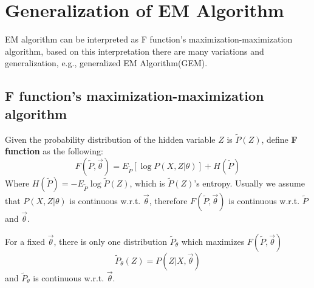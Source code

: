 \section{Generalization of EM Algorithm}
EM algorithm can be interpreted as F function's maximization-maximization algorithm, based on this interpretation there are many variations and generalization, e.g., generalized EM Algorithm(GEM).


\subsection{F function's maximization-maximization algorithm}
\begin{definition}
Given the probability distribution of the hidden variable $Z$ is $\tilde{P}(Z)$, define \textbf{F function} as the following:
\begin{equation}
F(\tilde{P},\vec{\theta})=E_{\tilde{P}}\left[\log{P(X,Z|\theta)}\right]+H(\tilde{P})
\end{equation}
Where $H(\tilde{P})=-E_{\tilde{P}}\log\tilde{P}(Z)$, which is $\tilde{P}(Z)$'s entropy. Usually we assume that $P(X,Z|\theta)$ is continuous w.r.t. $\vec{\theta}$, therefore $F(\tilde{P},\vec{\theta})$ is continuous w.r.t. $\tilde{P}$ and $\vec{\theta}$.
\end{definition}

\begin{lemma}
\label{lemma:F-function}
For a fixed $\vec{\theta}$, there is only one distribution $\tilde{P}_{\theta}$ which maximizes $F(\tilde{P},\vec{\theta})$
\begin{equation}
\tilde{P}_{\theta}(Z)=P(Z|X, \vec{\theta})
\end{equation}
and $\tilde{P}_{\theta}$ is continuous w.r.t. $\vec{\theta}$.
\end{lemma}

